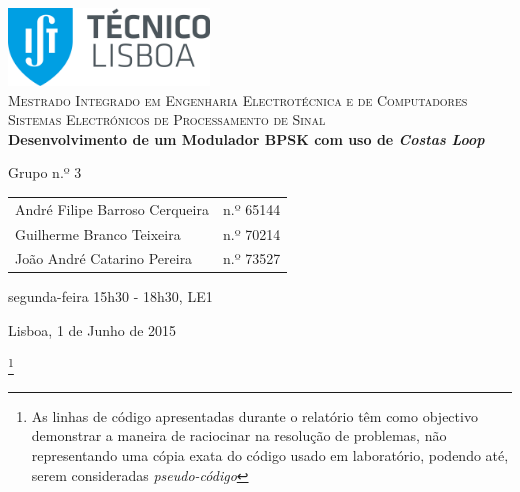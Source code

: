 \documentclass[11pt]{article}
\numberwithin{equation}{section}
\begin{document}
	
	
	\begin{titlepage}
		\begin{center}
			
			\hfill \break
			\hfill \break
			
			\includegraphics[width=0.4\textwidth]{./logo}~\\[1cm]
			
			\textsc{\Large Mestrado Integrado em Engenharia Electrotécnica e de Computadores}\\[1.5cm]
			\textsc{\huge Sistemas Electrónicos de Processamento de Sinal}\\[0.4cm]
			
			{\huge \bfseries Desenvolvimento de um Modulador BPSK com uso de \textit{Costas Loop} \\[1.2cm]}
			
			Grupo n.º 3 \vspace{0.3cm}
			
			\begin{tabular}{l r}
				André Filipe Barroso Cerqueira \hspace{1mm} & n.º 65144 \\
				Guilherme Branco Teixeira \hspace{1mm} & n.º 70214  \\
				João André Catarino Pereira & n.º 73527
			\end{tabular}
			
			\hfill
			\hfill
			
			segunda-feira 15h30 - 18h30, LE1
			
			
			\vfill
			
			{\large Lisboa, 1 de Junho de 2015} 
			
		\end{center}
	\end{titlepage}
	\clearpage
	
	\footnote{As linhas de código apresentadas durante o relatório têm como objectivo demonstrar a maneira de raciocinar na resolução de problemas, não representando uma cópia exata do código usado em laboratório, podendo até, serem consideradas \textit{pseudo-código}}
	
	\tableofcontents
	\pagebreak
	
\end{document}
